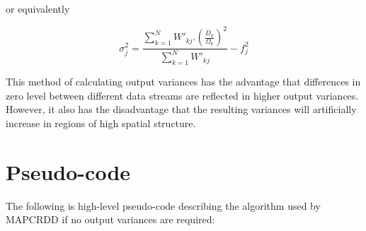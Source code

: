 \begin{enumerate}
or equivalently

\begin{equation}
\sigma^{2}_{j}=\frac{\sum_{k=1}^{N}W\prime_{kj}.(\frac{D_{k}}{\Omega_{k}})^{2}}
{\sum_{k=1}^{N}W\prime_{kj}} - f_{j}^2
\label {EQ:SIGMAJ2}
\end{equation}

This method of calculating output variances has the advantage that differences
in zero level between different data streams are reflected in higher output
variances. However, it also has the disadvantage that the resulting variances
will artificially increase in regions of high spatial structure. 

\end{enumerate}

\section{Pseudo-code}
The following is high-level pseudo-code describing the algorithm used by MAPCRDD
if no output variances are required: 

